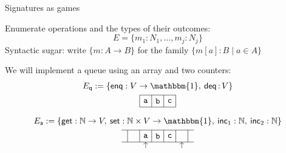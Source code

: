 \documentclass[aspectratio=141]{beamer}
\newcommand{\kw}[1]{\ensuremath{ \mathsf{#1} }}
\begin{document}
\begin{frame}{Signatures as games} %
  \begin{definition}[Signature]
  Enumerate operations and the types of their outcomes:
  \[
    E = \{ m_1 \mathop{:} N_1, \ldots, m_j \mathop{:} N_j \}
  \]
  Syntactic sugar:
  write $\{ m : A \rightarrow B \}$
  for the family $\{ m[a] : B \mid a \in A \}$
  \end{definition}
  \pause
  \begin{example}
    We will implement a queue using an array and two counters:
    \begin{gather*}
      E_\kw{q} := \{
        \kw{enq} : V \rightarrow \mathbbm{1}, \:
        \kw{deq} \mathop{:} V \}
      \\
      \begin{tikzpicture}[scale=0.5]
        \draw (0,0) grid (3,1);
        \node at (0.5,0.5) {$\mathtt{a}$};
        \node at (1.5,0.5) {$\mathtt{b}$};
        \node at (2.5,0.5) {$\mathtt{c}$};
      \end{tikzpicture}
      \\[1ex]
      E_\kw{a} := \{
        \kw{get} : \mathbb{N} \rightarrow V, \:
        \kw{set} : \mathbb{N} \times V \rightarrow \mathbbm{1}, \:
        \kw{inc}_1 : \mathbb{N}, \:
        \kw{inc}_2 : \mathbb{N} \}
      \\
      \begin{tikzpicture}[scale=0.5]
        \draw (-0.5,0) grid (5.5,1);
        \node at (1.5,0.5) {$\mathtt{a}$};
        \node at (2.5,0.5) {$\mathtt{b}$};
        \node at (3.5,0.5) {$\mathtt{c}$};
        \draw[->] (1.5,-0.5) -- (1.5,0);
        \draw[->] (4.5,-0.5) -- (4.5,0);
      \end{tikzpicture}
    \end{gather*}
  \end{example}
\end{frame}
\end{document}
